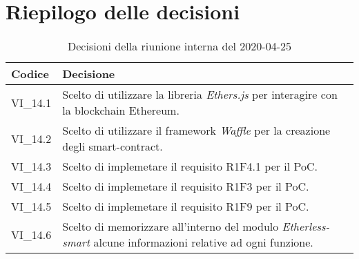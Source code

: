 \section{Riepilogo delle decisioni}
\begin{longtable}{ 
	 >{\centering}p{} >{}p{} }
	
	\caption{Decisioni della riunione interna del 2020-04-25}\\	
	
	\textbf{\color{white}Codice} & 
	\textbf{\color{white}Decisione} 
	\tabularnewline  
	\endhead
	
	VI\_14.1 & Scelto di utilizzare la libreria \textit{Ethers.js} per interagire con la blockchain Ethereum. \\
	VI\_14.2 & Scelto di utilizzare il framework \textit{Waffle} per la creazione degli smart-contract. \\
	VI\_14.3 & Scelto di implemetare il requisito R1F4.1 per il PoC. \\
	VI\_14.4 & Scelto di implemetare il requisito R1F3 per il PoC. \\
	VI\_14.5 & Scelto di implemetare il requisito R1F9 per il PoC. \\	
	VI\_14.6 & Scelto di memorizzare all'interno del modulo \textit{Etherless-smart} alcune informazioni relative ad ogni funzione. \\
	

\end{longtable}